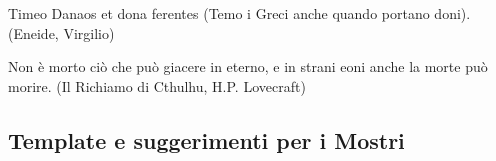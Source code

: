 \vfill

\begin{enfasi}

Timeo Danaos et dona ferentes (Temo i Greci anche quando portano doni). (Eneide, Virgilio)

\medskip

Non è morto ciò che può giacere in eterno, e in strani eoni anche la morte può morire. (Il Richiamo di Cthulhu, H.P. Lovecraft)

\end{enfasi}

\pagebreak

\subsection{Template e suggerimenti per i Mostri}

